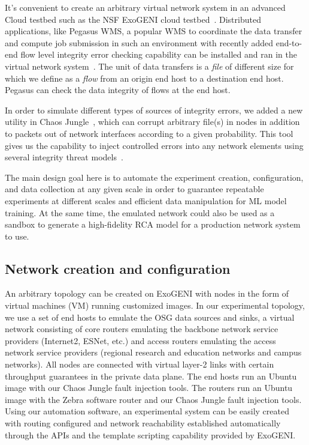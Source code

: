 It's convenient to create an arbitrary virtual network system in an advanced Cloud testbed such as the NSF ExoGENI cloud testbed~\cite{ExoGENI:web}. Distributed applications, like Pegasus WMS, a popular WMS to coordinate the data transfer and compute job submission in such an environment with recently added end-to-end flow level integrity error checking capability can be installed and ran in the virtual network system~\cite{swip:pearc:2019}. The unit of data transfers is a {\it file} of different size for which we define as a {\it flow} from an origin end host to a destination end host. Pegasus can check the data integrity of flows at the end host.     

In order to simulate different types of sources of integrity errors, we added a new utility in Chaos Jungle~\cite{swip:pearc:2019,chaosjungle:web}, which can corrupt arbitrary file(s) in nodes in addition to packets out of network interfaces according to a given probability. This tool gives us the capability to inject controlled errors into any network elements using several integrity threat models~\cite{threat-model}.

The main design goal here is to automate the experiment creation, configuration, and data collection at any given scale in order to guarantee repeatable experiments at different scales and efficient data manipulation for ML model training. 
At the same time,  the emulated network could also be used as a sandbox to generate a high-fidelity RCA model for a production network system to use. 

\subsection{Network creation and configuration}
An arbitrary topology can be created on ExoGENI with nodes in the form of virtual machines (VM) running customized images. In our experimental topology, we use a set of end hosts to emulate the OSG data sources and sinks, a virtual network consisting of core routers emulating the backbone network service providers (Internet2, ESNet, etc.) and access routers emulating the access network service providers (regional research and education networks and campus networks). All nodes are connected with virtual layer-2 links with certain throughput guarantees in the private data plane. The end hosts run an Ubuntu image with our Chaos Jungle fault injection tools. The routers run an Ubuntu image with the Zebra software router and our Chaos Jungle fault injection tools. Using our automation software, an experimental system can be easily created with routing configured and network reachability established automatically through the APIs and the template scripting capability provided by ExoGENI.   

